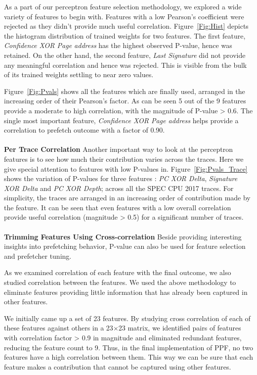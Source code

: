 As a part of our perceptron feature selection methodology, we explored a wide 
variety of features to begin with. Features with a low 
Pearson's coefficient were rejected as they didn't provide much useful 
correlation. Figure~\ref{Fig:Hist} depicts the histogram distribution of 
trained weights for two features. The first feature, 
\textit{Confidence XOR Page address} has the highest observed P-value, 
hence was retained. On the other hand, the second feature, \textit{Last Signature}
did not provide any meaningful correlation and hence was rejected. 
This is visible from the bulk of its trained weights settling to near zero values.

Figure~\ref{Fig:Pvals} shows all the features which are finally used, 
arranged in the increasing order of their Pearson's factor. 
As can be seen 5 out of the 9 features provide a moderate to high 
correlation, with the magnitude of P-value > 0.6. The single most 
important feature, \textit{Confidence XOR Page address} helps provide
a correlation to prefetch outcome with a factor of 0.90. \\ \\
%
\textbf{Per Trace Correlation} \newline Another important way to look
at the perceptron features is to see how much their contribution
varies across the traces. Here we give special attention to features
with low P-values in. Figure~\ref{Fig:Pvals_Trace} shows the
variation of P-values for three features : \textit{PC XOR Delta},
\textit{Signature XOR Delta} and 
\textit{PC XOR Depth}; across all the SPEC CPU 2017 traces. 
For simplicity, the traces are arranged in an
increasing order of contribution made by the feature. 
It can be seen that even features with a low
overall correlation provide useful correlation (magnitude > 0.5) for
a significant number of traces. \\ \\
%
\textbf{Trimming Features Using Cross-correlation} \newline Beside
providing interesting insights into prefetching behavior, P-value can
also be used for feature selection and prefetcher tuning.

As we examined correlation of each feature with the final outcome, we also
studied correlation between the features. We used the above methodology to
eliminate features providing little information that has already been captured
in other features.

We initially came up a set of 23 features. By studying
cross correlation of each of these features against others in a 23$\times$23
matrix, we identified pairs of features with correlation factor > 0.9 in
magnitude and eliminated redundant features, reducing the feature count to 9.
Thus, in the final implementation of PPF, no two features have a high
correlation between them. This way we can be sure that each feature makes a
contribution that cannot be captured using other features.

